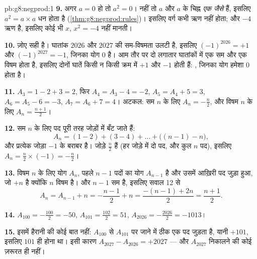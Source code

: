 \begin{solution}{pb:g8:negprod:1}
\textbf{9.} अगर $a = 0$ हो तो $a^2 = 0$। नहीं तो $a$ और $a$ के
चिह्न \emph{एक जैसे} हैं, इसलिए $a^2 = a \times a$ धन होता है
(\cref{thm:g8:negprod:rules})। इसलिए वर्ग कभी ऋण नहीं होता; और $-4$
ऋण है, इसलिए कोई भी  $x$, $x^2 = -4$ नहीं मानती।

\textbf{10.} ज़ोए सही है। घातांक $2026$ और $2027$ की सम-विषमता उलटी
है, इसलिए $(-1)^{2026} = +1$ और $(-1)^{2027} = -1$, जिनका योग $0$
है। आम तौर पर दो लगातार घातांकों में एक सम और एक विषम होता है,
इसलिए दोनों घातें किसी न किसी क्रम में $+1$ और $-1$ होती हैं:
, जिनका योग हमेशा $0$ होता है।

\textbf{11.} $A_3 = 1 - 2 + 3 = 2$, फिर $A_4 = A_3 - 4 = -2$,
$A_5 = A_4 + 5 = 3$, $A_6 = A_5 - 6 = -3$, $A_7 = A_6 + 7 = 4$।
अटकल: सम $n$ के लिए $A_n = -\frac{n}{2}$, और विषम $n$ के लिए
$A_n = \frac{n+1}{2}$।

\textbf{12.} सम $n$ के लिए पद पूरी तरह जोड़ों में बँट जाते हैं:
\[
A_n = (1 - 2) + (3 - 4) + \dots + \bigl((n-1) - n\bigr),
\]
और प्रत्येक जोड़ा $-1$ के बराबर है। जोड़े $\frac{n}{2}$ हैं (हर जोड़े
में दो पद, और कुल $n$ पद), इसलिए
$A_n = \frac{n}{2} \times (-1) = -\frac{n}{2}$।

\textbf{13.} विषम $n$ के लिए योग $A_n$, पहले $n - 1$ पदों का योग
$A_{n-1}$ है और उसमें आख़िरी पद जुड़ा हुआ, जो $+n$ है क्योंकि $n$
विषम है। और $n - 1$ सम है, इसलिए सवाल 12 से
\[
A_n = A_{n-1} + n = -\frac{n-1}{2} + n
= \frac{-(n-1) + 2n}{2} = \frac{n+1}{2} .
\]

\textbf{14.} $A_{100} = -\frac{100}{2} = -50$, \quad
$A_{101} = \frac{102}{2} = 51$, \quad
$A_{2026} = -\frac{2026}{2} = -1013$।

\textbf{15.} इसमें हैरानी की कोई बात नहीं: $A_{100}$ से $A_{101}$
पर जाने में ठीक एक पद जुड़ता है, यानी $+101$, इसलिए  $101$ ही
होना था। इसी कारण $A_{2027} - A_{2026} = +2027$ --- और $A_{2027}$
निकालने की कोई ज़रूरत ही नहीं।

\end{solution}
